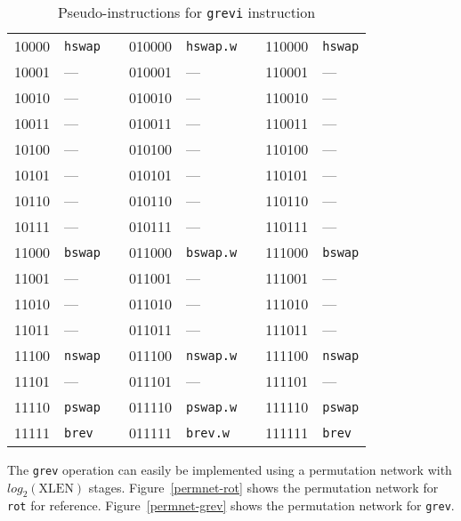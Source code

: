 \begin{table}[h]
\begin{small}
\begin{center}
\begin{tabular}{l l p{0.5in} l l p{0.3in} l l}
\cline{1-2}
\cline{4-5}
\cline{7-8}

10000 & {\tt hswap}   &   &   010000 & {\tt hswap.w} &   &   110000 & {\tt hswap} \\
10001 & ---           &   &   010001 & ---           &   &   110001 & ---         \\
10010 & ---           &   &   010010 & ---           &   &   110010 & ---         \\
10011 & ---           &   &   010011 & ---           &   &   110011 & ---         \\
10100 & ---           &   &   010100 & ---           &   &   110100 & ---         \\
10101 & ---           &   &   010101 & ---           &   &   110101 & ---         \\
10110 & ---           &   &   010110 & ---           &   &   110110 & ---         \\
10111 & ---           &   &   010111 & ---           &   &   110111 & ---         \\

\cline{1-2}
\cline{4-5}
\cline{7-8}

11000 & {\tt bswap}   &   &   011000 & {\tt bswap.w} &   &   111000 & {\tt bswap} \\
11001 & ---           &   &   011001 & ---           &   &   111001 & ---         \\
11010 & ---           &   &   011010 & ---           &   &   111010 & ---         \\
11011 & ---           &   &   011011 & ---           &   &   111011 & ---         \\
11100 & {\tt nswap}   &   &   011100 & {\tt nswap.w} &   &   111100 & {\tt nswap} \\
11101 & ---           &   &   011101 & ---           &   &   111101 & ---         \\
11110 & {\tt pswap}   &   &   011110 & {\tt pswap.w} &   &   111110 & {\tt pswap} \\
11111 & {\tt brev}    &   &   011111 & {\tt brev.w}  &   &   111111 & {\tt brev}  \\
\end{tabular}
\end{center}
\end{small}
\caption{Pseudo-instructions for {\tt grevi} instruction}
\label{grevi-modes}
\end{table}

The {\tt grev} operation can easily be implemented using a permutation
network with $log_2(\textrm{XLEN})$ stages. Figure~\ref{permnet-rot}
shows the permutation network for {\tt rot} for reference.
Figure~\ref{permnet-grev} shows the permutation network for {\tt grev}.

